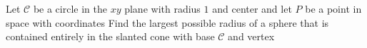 Let $\mathcal{C}$ be a circle in the $xy$ plane with radius $1$ and center  and let $P$ be a point in space with coordinates  Find the largest possible radius of a sphere that is contained entirely in the slanted cone with base $\mathcal{C}$ and vertex 